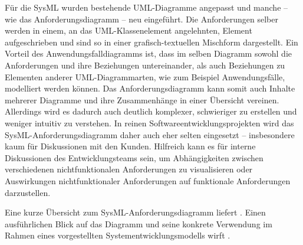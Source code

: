 Für die SysML wurden bestehende UML-Diagramme angepasst und manche -- wie das Anforderungsdiagramm -- neu eingeführt. Die Anforderungen selber werden in einem, an das UML-Klassenelement angelehnten, Element aufgeschrieben und sind so in einer grafisch-textuellen Mischform dargestellt. Ein Vorteil des Anwendungsfalldiagramms ist, dass im selben Diagramm sowohl die Anforderungen und ihre Beziehungen untereinander, als auch Beziehungen zu Elementen anderer UML-Diagrammarten, wie zum Beispiel Anwendungsfälle, modelliert werden können. Das Anforderungsdiagramm kann somit auch Inhalte mehrerer Diagramme und ihre \mbox{Zusammenhänge} in einer Übersicht vereinen. Allerdings wird es dadurch auch deutlich komplexer, schwieriger zu erstellen und weniger intuitiv zu verstehen. In reinen Softwareentwicklungsprojekten wird das SysML-Anforderungsdiagramm daher auch eher selten eingesetzt -- insbesondere kaum für Diskussionen mit den Kunden. Hilfreich kann es für interne Diskussionen des Entwicklungsteams sein, um Abhängigkeiten zwischen verschiedenen nichtfunktionalen Anforderungen zu visualisieren oder Auswirkungen nichtfunktionaler Anforderungen auf funktionale Anforderungen darzustellen. 

\vspace{1mm} %

Eine kurze Übersicht zum SysML-Anforderungsdiagramm liefert \cite[51-53]{alt12}. Einen ausführlichen Blick auf das Diagramm und seine konkrete Verwendung im Rahmen eines vorgestellten Systementwicklungsmodells wirft \cite[234 \psqq]{wei14}.